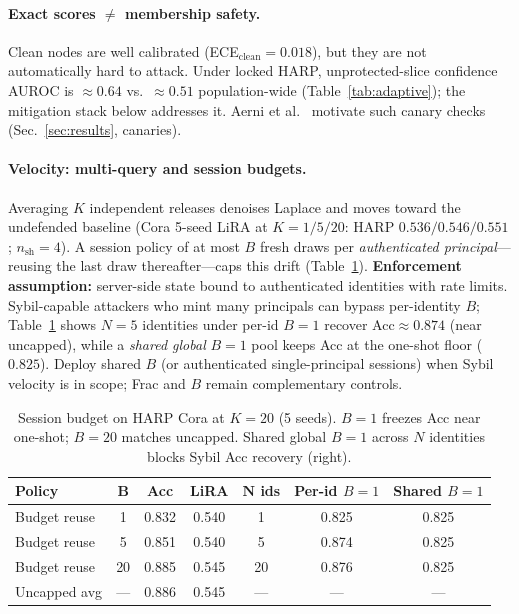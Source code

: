 \documentclass[conference]{IEEEtran}
\begin{document}
\paragraph{Exact scores $\neq$ membership safety.}
Clean nodes are well calibrated (ECE$_{\mathrm{clean}}{=}0.018$), but they are not automatically hard to attack.
Under locked HARP, unprotected-slice confidence AUROC is ${\approx}0.64$ vs.\ ${\approx}0.51$ population-wide (Table~\ref{tab:adaptive}); the mitigation stack below addresses it.
Aerni et al.~\cite{aerni2024misleading} motivate such canary checks (Sec.~\ref{sec:results}, canaries).

\paragraph{Velocity: multi-query and session budgets.}
Averaging $K$ independent releases denoises Laplace and moves toward the undefended baseline (Cora 5-seed LiRA at $K{=}1/5/20$: HARP $0.536/0.546/0.551$; $n_{\mathrm{sh}}{=}4$).
A session policy of at most $B$ fresh draws per \emph{authenticated principal}---reusing the last draw thereafter---caps this drift (Table~\ref{tab:session}).
\textbf{Enforcement assumption:} server-side state bound to authenticated identities with rate limits.
Sybil-capable attackers who mint many principals can bypass per-identity $B$; Table~\ref{tab:session} shows $N{=}5$ identities under per-id $B{=}1$ recover Acc${\approx}0.874$ (near uncapped), while a \emph{shared global} $B{=}1$ pool keeps Acc at the one-shot floor ($0.825$).
Deploy shared $B$ (or authenticated single-principal sessions) when Sybil velocity is in scope; Frac and $B$ remain complementary controls.

\begin{table}[!t]
\caption{Session budget on HARP Cora at $K{=}20$ (5 seeds). $B{=}1$ freezes Acc near one-shot; $B{=}20$ matches uncapped.
Shared global $B{=}1$ across $N$ identities blocks Sybil Acc recovery (right).}
\label{tab:session}
\centering
\scriptsize
\begin{tabular}{@{}lccc|ccc@{}}
\toprule
\textbf{Policy} & $\mathbf{B}$ & \textbf{Acc} & \textbf{LiRA} & $\mathbf{N}$ ids & \textbf{Per-id $B{=}1$} & \textbf{Shared $B{=}1$} \\
\midrule
Budget reuse & 1 & 0.832 & 0.540 & 1 & 0.825 & 0.825 \\
Budget reuse & 5 & 0.851 & 0.540 & 5 & 0.874 & 0.825 \\
Budget reuse & 20 & 0.885 & 0.545 & 20 & 0.876 & 0.825 \\
Uncapped avg & --- & 0.886 & 0.545 & --- & --- & --- \\
\bottomrule
\end{tabular}
\end{table}
\end{document}
